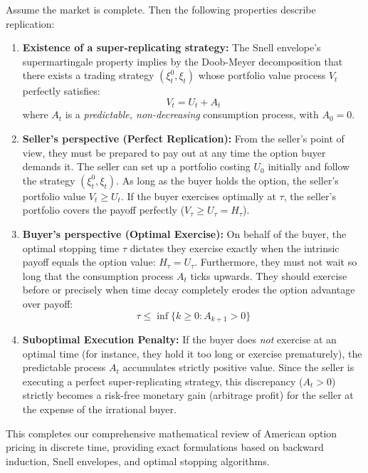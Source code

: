 \begin{proposition}
Assume the market is complete. Then the following properties describe replication:
\begin{enumerate}[label=(\roman*)]
    \item \textbf{Existence of a super-replicating strategy:} The Snell envelope's supermartingale property implies by the Doob-Meyer decomposition that there exists a trading strategy $(\xi^0_t, \xi_t)$ whose portfolio value process $V_t$ perfectly satisfies:
    $$ V_t = U_t + A_t $$
    where $A_t$ is a \textit{predictable, non-decreasing} consumption process, with $A_0 = 0$.
    
    \item \textbf{Seller's perspective (Perfect Replication):} From the seller's point of view, they must be prepared to pay out at any time the option buyer demands it. The seller can set up a portfolio costing $U_0$ initially and follow the strategy $(\xi^0_t, \xi_t)$. As long as the buyer holds the option, the seller's portfolio value $V_t \geq U_t$. If the buyer exercises optimally at $\tau$, the seller's portfolio covers the payoff perfectly ($V_\tau \geq U_\tau = H_\tau$).
    
    \item \textbf{Buyer's perspective (Optimal Exercise):} On behalf of the buyer, the optimal stopping time $\tau$ dictates they exercise exactly when the intrinsic payoff equals the option value: $H_\tau = U_\tau$. 
    Furthermore, they must not wait so long that the consumption process $A_t$ ticks upwards. They should exercise before or precisely when time decay completely erodes the option advantage over payoff:
    $$ \tau \leq \inf \{ k \geq 0 : A_{k+1} > 0 \} $$

    \item \textbf{Suboptimal Execution Penalty:} If the buyer does \textit{not} exercise at an optimal time (for instance, they hold it too long or exercise prematurely), the predictable process $A_t$ accumulates strictly positive value. Since the seller is executing a perfect super-replicating strategy, this discrepancy ($A_t > 0$) strictly becomes a risk-free monetary gain (arbitrage profit) for the seller at the expense of the irrational buyer.
\end{enumerate}
\end{proposition}

This completes our comprehensive mathematical review of American option pricing in discrete time, providing exact formulations based on backward induction, Snell envelopes, and optimal stopping algorithms.
